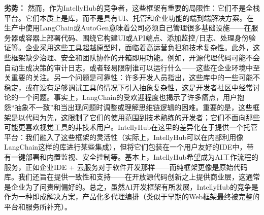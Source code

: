 \documentclass[11pt, a4paper, oneside]{article}
\begin{document}
\textbf{劣势：} 然而，作为IntellyHub的竞争者，这些框架有重要的局限性：它们不是全栈平台。它们本质上是库，而不是具有UI、托管和企业功能的端到端解决方案。在生产中使用LangChain或AutoGen意味着公司必须自己管理很多基础设施——在服务器或容器上部署代码、围绕它构建UI或API端点、添加监控/日志、处理身份验证等。企业采用这些工具超越原型时，面临着高运营负担和技术复杂性。此外，这些框架缺少治理、安全和团队协作的开箱即用功能。例如，开源代理代码可能不会自动生成决策的审计日志，或者轻易限制谁可以运行什么——这些在企业环境中至关重要的关注。另一个问题是可靠性：许多开发人员指出，这些库中的一些可能不稳定，或在没有足够调试工具的情况下引入抽象复杂性，这是开发者社区中经常讨论的一个问题\cite{langchainCritique}。事实上，LangChain的受欢迎程度也揭示了许多痛点，用户抱怨“抽象不一致”和当出现问题时调整或理解思维链逻辑的困难。重要的是，这些框架是以代码为先，这限制了它们的使用范围到技术熟练的开发者；它们不面向那些可能更喜欢视觉工具的非技术用户。IntellyHub在这里的差异化在于提供一个托管平台：我们融入了这些框架的灵活性（实际上，IntellyHub可以在内部利用像LangChain这样的库进行某些集成），但将它们包装在一个用户友好的IDE中，带有一键部署和内置监视、安全控制等。基本上，IntellyHub希望成为AI工作流程的服务，正如企业IDE + 云服务对于软件开发那样——而纯框架更像是原始代码库。我们还旨在提供一致性和支持——在开放源代码创新之上提供商业层，这通常是企业为了问责制偏好的。总之，虽然AI开发框架有所发展，IntellyHub的竞争是作为一种即成解决方案，产品化多代理编排（类似于早期的Web框架最终被完整的平台和服务所补充）。
\end{document}
